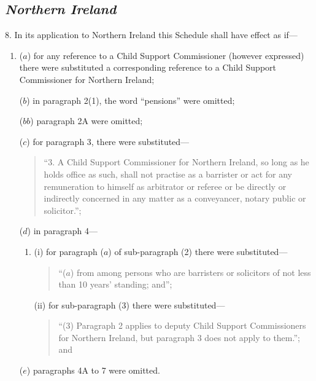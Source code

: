 \documentclass[12pt,a4paper]{article}
\begin{document}
\subsection*{\itshape Northern Ireland}

8. In its application to Northern Ireland this Schedule shall have effect as if—
\begin{enumerate}\item[]
($a$) for any reference to a Child Support Commissioner (however expressed) there were substituted a corresponding reference to a Child Support Commissioner for Northern Ireland;

($b$) in paragraph 2(1), the word “pensions” were omitted;

($bb$) paragraph 2A were omitted;

($c$) for paragraph 3, there were substituted—
\begin{quotation}
“3. A Child Support Commissioner for Northern Ireland, so long as he holds office as such, shall not practise as a barrister or act for any remuneration to himself as arbitrator or referee or be directly or indirectly concerned in any matter as a conveyancer, notary public or solicitor.”;
\end{quotation}

($d$) in paragraph 4—
\begin{enumerate}\item[]
(i) for paragraph ($a$)  of sub-paragraph (2)  there were substituted—
\begin{quotation}
“($a$) from among persons who are barristers or solicitors of not less than 10 years' standing; and”;
\end{quotation}

(ii) for sub-paragraph (3)  there were substituted—
\begin{quotation}
“(3) Paragraph 2 applies to deputy Child Support Commissioners for Northern Ireland, but paragraph 3 does not apply to them.”; and
\end{quotation}
\end{enumerate}

($e$) 
paragraphs 4A  %
to 7 were omitted.
\end{enumerate}

\end{document}
